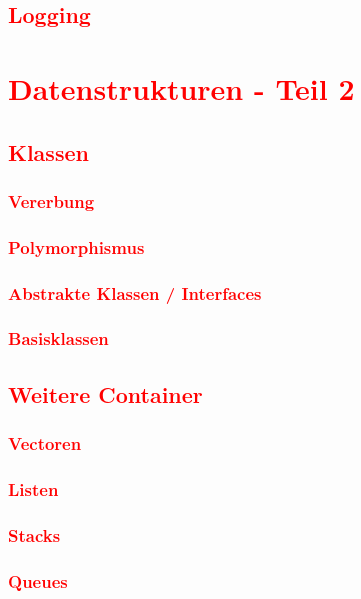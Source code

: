 \section{\textcolor{red}{Logging}}\label{sec:logging}

\cleardoublepage\chapter{\textcolor{red}{Datenstrukturen - Teil 2}}\label{chap:datastructures-2}
\section{\textcolor{red}{Klassen}}\label{sec:classes-2}
\subsection{\textcolor{red}{Vererbung}}\label{sec:inheritance}
\subsection{\textcolor{red}{Polymorphismus}}\label{sec:polymorphism}
\subsection{\textcolor{red}{Abstrakte Klassen / Interfaces}}\label{sec:abstract-classes}
\subsection{\textcolor{red}{Basisklassen}}\label{sec:base-classes}
\section{\textcolor{red}{Weitere Container}}\label{sec:containers}
\subsection{\textcolor{red}{Vectoren}}\label{sec:vectors}
\subsection{\textcolor{red}{Listen}}\label{sec:lists}
\subsection{\textcolor{red}{Stacks}}\label{sec:stacks}
\subsection{\textcolor{red}{Queues}}\label{sec:queues}
